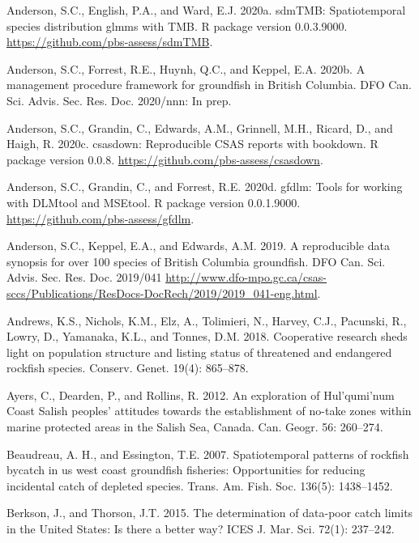 \documentclass[11pt]{book}
\begin{document}
\leavevmode\hypertarget{ref-sdmtmb}{}%
Anderson, S.C., English, P.A., and Ward, E.J. 2020a. sdmTMB: Spatiotemporal species distribution glmms with TMB. R package version 0.0.3.9000. \url{https://github.com/pbs-assess/sdmTMB}.

\leavevmode\hypertarget{ref-anderson2020gfmp}{}%
Anderson, S.C., Forrest, R.E., Huynh, Q.C., and Keppel, E.A. 2020b. A management procedure framework for groundfish in British Columbia. DFO Can. Sci. Advis. Sec. Res. Doc. 2020/nnn: In prep.

\leavevmode\hypertarget{ref-csasdown}{}%
Anderson, S.C., Grandin, C., Edwards, A.M., Grinnell, M.H., Ricard, D., and Haigh, R. 2020c. csasdown: Reproducible CSAS reports with bookdown. R package version 0.0.8. \url{https://github.com/pbs-assess/csasdown}.

\leavevmode\hypertarget{ref-gfdlm}{}%
Anderson, S.C., Grandin, C., and Forrest, R.E. 2020d. gfdlm: Tools for working with DLMtool and MSEtool. R package version 0.0.1.9000. \url{https://github.com/pbs-assess/gfdlm}.

\leavevmode\hypertarget{ref-anderson2019synopsis}{}%
Anderson, S.C., Keppel, E.A., and Edwards, A.M. 2019. A reproducible data synopsis for over 100 species of British Columbia groundfish. DFO Can. Sci. Advis. Sec. Res. Doc. 2019/041 \url{http://www.dfo-mpo.gc.ca/csas-sccs/Publications/ResDocs-DocRech/2019/2019_041-eng.html}.

\leavevmode\hypertarget{ref-andrews2018}{}%
Andrews, K.S., Nichols, K.M., Elz, A., Tolimieri, N., Harvey, C.J., Pacunski, R., Lowry, D., Yamanaka, K.L., and Tonnes, D.M. 2018. Cooperative research sheds light on population structure and listing status of threatened and endangered rockfish species. Conserv. Genet. 19(4): 865--878.

\leavevmode\hypertarget{ref-ayers2012}{}%
Ayers, C., Dearden, P., and Rollins, R. 2012. An exploration of Hul'qumi'num Coast Salish peoples' attitudes towards the establishment of no-take zones within marine protected areas in the Salish Sea, Canada. Can. Geogr. 56: 260--274.

\leavevmode\hypertarget{ref-beaudreau2007}{}%
Beaudreau, A. H., and Essington, T.E. 2007. Spatiotemporal patterns of rockfish bycatch in us west coast groundfish fisheries: Opportunities for reducing incidental catch of depleted species. Trans. Am. Fish. Soc. 136(5): 1438--1452.

\leavevmode\hypertarget{ref-berkson2015}{}%
Berkson, J., and Thorson, J.T. 2015. The determination of data-poor catch limits in the United States: Is there a better way? ICES J. Mar. Sci. 72(1): 237--242.
\end{document}
